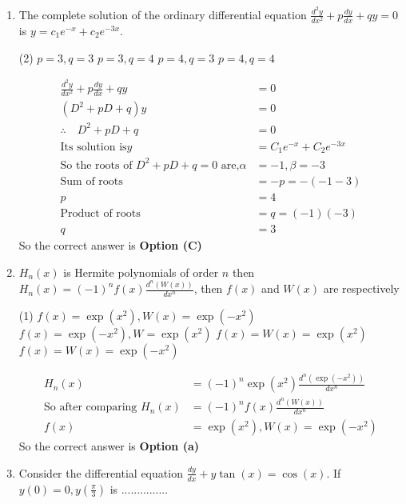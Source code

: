 \begin{enumerate}[label=\color{ocre}\textbf{\arabic*.}]
\item The complete solution of the ordinary differential equation $\frac{d^{2} y}{d x^{2}}+p \frac{d y}{d x}+q y=0$ is $y=c_{1} e^{-x}+c_{2} e^{-3 x}$.
\begin{tasks}(2)
	\task[\textbf{a.}] $p=3, q=3 $
	\task[\textbf{b.}]$p=3, q=4 $
	\task[\textbf{c.}] $p=4, q=3 $
	\task[\textbf{d.}] $p=4, q=4 $
\end{tasks}
\begin{answer}
	$$
	\begin{aligned}
	\frac{d^{2} y}{d x^{2}}+p \frac{d y}{d x}+q y&=0\\
	\left(D^{2}+p D+q\right) y&=0\\
	\therefore \quad D^{2}+p D+q&=0\\
	\text{Its solution is}  y&=C_{1} e^{-x}+C_{2} e^{-3 x}\\
	\text{So the roots of $D^{2}+p D+q=0$ are,}   \alpha&=-1 , \beta=-3 \\
	\text{Sum of roots} &=-p=-(-1-3) \\p&=4 \\
	\text{Product of roots} &=q=(-1)(-3) \\ q&=3
	\end{aligned}$$
	So the correct answer is \textbf{Option (C)}
\end{answer}
\item $H_{n}(x)$ is Hermite polynomials of order $n$ then $H_{n}(x)=(-1)^{n} f(x) \frac{d^{n}(W(x))}{d x^{n}}$, then $f(x)$ and $W(x)$ are respectively
\begin{tasks}(1)
	\task[\textbf{a.}]$f(x)=\exp \left(x^{2}\right), W(x)=\exp \left(-x^{2}\right)$
	\task[\textbf{b.}]$f(x)=\exp \left(-x^{2}\right), W=\exp \left(x^{2}\right)$
	\task[\textbf{c.}] $f(x)=W(x)=\exp \left(x^{2}\right)$
	\task[\textbf{d.}] $f(x)=W(x)=\exp \left(-x^{2}\right)$
\end{tasks}
\begin{answer}
	$$\begin{aligned}
	H_{n}(x)&=(-1)^{n} \exp \left(x^{2}\right) \frac{d^{n}\left(\exp \left(-x^{2}\right)\right)}{d x^{n}}\\
	\text{So after comparing }H_{n}(x)&=(-1)^{n} f(x) \frac{d^{n}(W(x))}{d x^{n}}\\
	f(x)&=\exp \left(x^{2}\right), W(x)=\exp \left(-x^{2}\right)
	\end{aligned}$$
	So the correct answer is \textbf{Option (a)}
\end{answer}
\item Consider the differential equation $\frac{d y}{d x}+y \tan (x)=\cos (x)$. If $y(0)=0, y\left(\frac{\pi}{3}\right)$ is ............... 

\end{enumerate}
